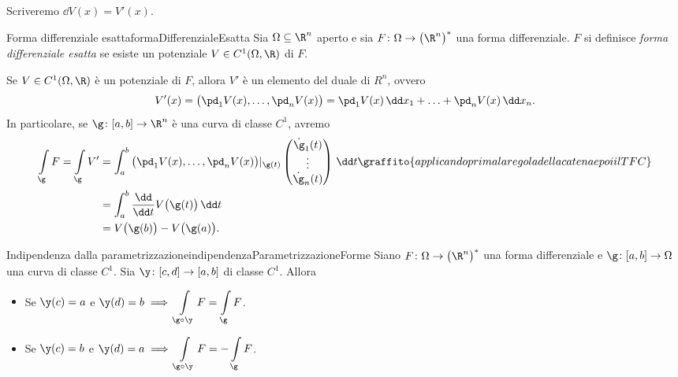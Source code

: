 \begin{notz}
	Scriveremo \(\dd V(x)=V'(x)\).
\end{notz}

\begin{defn}{Forma differenziale esatta}{formaDifferenzialeEsatta}
	Sia \(\Omega\subseteq\R^n\) aperto e sia \(F\colon \Omega\to \big(\R^n\big)^*\) una forma differenziale.
	\(F\) si definisce \emph{forma differenziale esatta} se esiste un potenziale \(V\in C^1(\Omega,\R)\) di \(F\).
\end{defn}

\begin{oss}
	Se \(V\in C^1(\Omega,\R)\) è un potenziale di \(F\), allora \(V'\) è un elemento del duale di \(R^n\), ovvero
	\[
		V'(x) = \big(\pd_1 V(x),\ldots,\pd_n V(x)\big) = \pd_1 V(x)\,\dd x_1 + \ldots + \pd_n V(x)\,\dd x_n.
	\]
	In particolare, se \(\g\colon [a,b]\to \R^n\) è una curva di classe \(C^1\), avremo
	\[
		\begin{split}
			\int\limits_\g F = \int\limits_\g V' & = \int_a^b \big(\pd_1 V(x),\ldots,\pd_n V(x)\big)|_{\g(t)} \begin{pmatrix}\dot{\g}_1(t)\\\vdots\\\dot{\g}_n(t)\end{pmatrix}\,\dd t\graffito{applicando prima la regola della catena e poi il TFC}\\
			& = \int_a^b \frac{\dd}{\dd t} V\big(\g(t)\big)\,\dd t\\
			& = V\big(\g(b)\big) - V\big(\g(a)\big).
		\end{split}
	\]
\end{oss}

\begin{teor}{Indipendenza dalla parametrizzazione}{indipendenzaParametrizzazioneForme}
	Siano \(F\colon \Omega \to \big(\R^n\big)^*\) una forma differenziale e \(\g\colon [a,b]\to \Omega\) una curva di classe \(C^1\).
	Sia \(\y\colon [c,d]\to [a,b]\) di classe \(C^1\).
	Allora
	\begin{itemize}
		\item Se \(\y(c)=a\) e \(\y(d)=b \implies \displaystyle \int\limits_{\g\circ \y} F = \int\limits_\g F\).
		\item Se \(\y(c)=b\) e \(\y(d)=a \implies \displaystyle \int\limits_{\g\circ \y} F = -\int\limits_\g F\).
	\end{itemize}
\end{teor}

